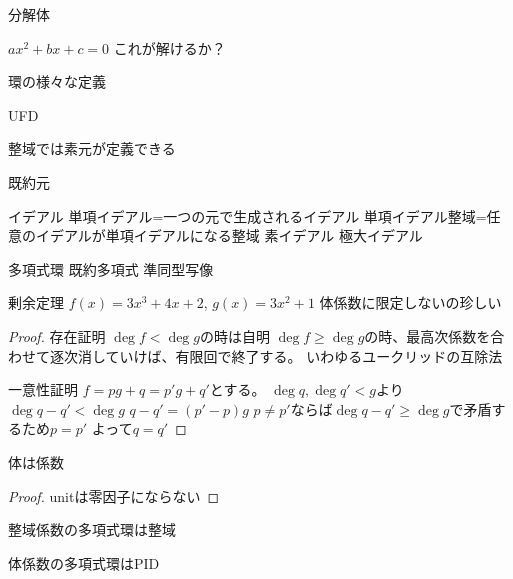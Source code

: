 分解体

$ax^2+bx+c=0$
これが解けるか？

環の様々な定義

UFD

整域では素元が定義できる

既約元

イデアル
単項イデアル=一つの元で生成されるイデアル
単項イデアル整域=任意のイデアルが単項イデアルになる整域
素イデアル
極大イデアル

多項式環
既約多項式
準同型写像

剰余定理
$f(x)=3x^3+4x+2$, $g(x)=3x^2+1$
体係数に限定しないの珍しい
\begin{proof}
    存在証明
    $\deg{f} < \deg{g}$の時は自明
    $\deg{f} \geq \deg{g}$の時、最高次係数を合わせて逐次消していけば、有限回で終了する。
    いわゆるユークリッドの互除法

    一意性証明
    $f=pg+q=p'g+q'$とする。
    $\deg{q}, \deg{q'} < {g}$より$\deg{q-q'}<\deg{g}$
    $q-q'=(p'-p)g$
    $p\neq p'$ならば$\deg{q-q'}\geq\deg{g}$で矛盾するため$p=p'$
    よって$q=q'$
\end{proof}

体は係数
\begin{proof}
    unitは零因子にならない
\end{proof}

整域係数の多項式環は整域

体係数の多項式環はPID

